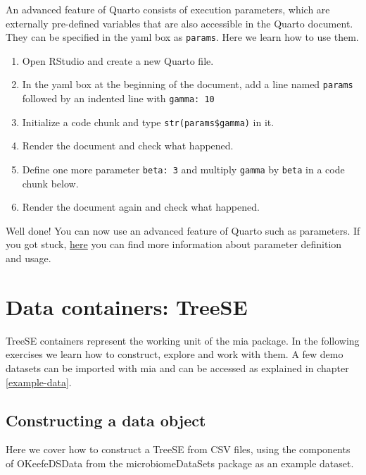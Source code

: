 \documentclass[
]{book}
\providecommand{\tightlist}{%
  \setlength{\itemsep}{0pt}\setlength{\parskip}{0pt}}
\begin{document}
An advanced feature of Quarto consists of execution parameters, which are
externally pre-defined variables that are also accessible in the Quarto document.
They can be specified in the yaml box as \texttt{params}. Here we learn how to use them.

\begin{enumerate}
\def\labelenumi{\arabic{enumi}.}
\tightlist
\item
  Open RStudio and create a new Quarto file.
\item
  In the yaml box at the beginning of the document, add a line named \texttt{params}
  followed by an indented line with \texttt{gamma:\ 10}
\item
  Initialize a code chunk and type \texttt{str(params\$gamma)} in it.
\item
  Render the document and check what happened.
\item
  Define one more parameter \texttt{beta:\ 3} and multiply \texttt{gamma} by \texttt{beta} in a code
  chunk below.
\item
  Render the document again and check what happened.
\end{enumerate}

Well done! You can now use an advanced feature of Quarto such as parameters.
If you got stuck, \href{https://quarto.org/docs/computations/parameters.html\#knitr}{here}
you can find more information about parameter definition and usage.

\hypertarget{data-containers-treese}{%
\section{Data containers: TreeSE}\label{data-containers-treese}}

TreeSE containers represent the working unit of the mia package. In the
following exercises we learn how to construct, explore and work with them.
A few demo datasets can be imported with mia and can be accessed as explained
in chapter \ref{example-data}.

\hypertarget{construct-TreeSE}{%
\subsection{Constructing a data object}\label{construct-TreeSE}}

Here we cover how to construct a TreeSE from CSV files, using the components
of OKeefeDSData from the microbiomeDataSets package as an example dataset.
\end{document}
